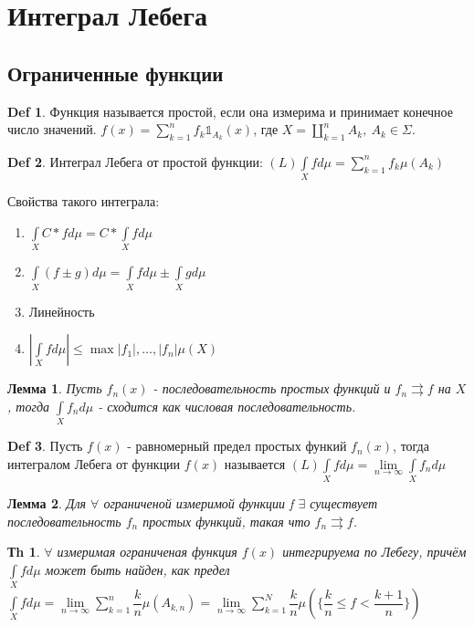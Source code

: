 \documentclass[14pt]{article}
\theoremstyle{plain}
\newtheorem{Thm}{Тh}
\newtheorem{Lem}{Лемма}
\theoremstyle{definition}
\newtheorem{Def}{Def}
\begin{document}
	\section{Интеграл Лебега}
		\subsection{Ограниченные функции}
		\begin{Def}
			Функция называется простой, если она измерима и принимает конечное число значений. $f(x) = \sum\limits_{k=1}^{n} f_k \mathbb{1}_{A_k}(x)$, где $X = \coprod\limits_{k=1}^{n} A_k, \ A_k \in \Sigma$.
		\end{Def}
		\begin{Def}
			Интеграл Лебега от простой функции: $(L)\int\limits_{X} f d\mu = \sum\limits_{k=1}^n f_k \mu(A_k)$
		\end{Def}
		Свойства такого интеграла:
		\begin{enumerate}
			\item $\int\limits_{X}C* f d\mu = C* \int\limits_{X} f d\mu$
			\item $\int\limits_{X} (f \pm g) d\mu = \int\limits_{X} f d\mu \pm \int\limits_{X} g d\mu$
			\item Линейность
			\item $| \int\limits_{X} fd\mu| \leq \max{|f_1|, \dots, |f_n|} \mu (X)$
		\end{enumerate}
		\begin{Lem}
			Пусть $f_n(x)$ - последовательность простых функций и $f_n \rightrightarrows f$ на $X$, тогда $\int\limits_{X} f_n d\mu $ - сходится как числовая последовательность.
		\end{Lem}
		\begin{Def}
			Пусть $f(x)$ - равномерный предел простых функий $f_n(x)$, тогда интегралом Лебега от функции $f(x)$ называется $(L) \int\limits_X f d\mu = \lim\limits_{n \to \infty} \int\limits_{X} f_n d\mu$
		\end{Def}
		\begin{Lem}
			Для $\forall$ ограниченой измеримой функции f $\exists$ существует последовательность $f_n$ простых функций, такая что $f_n \rightrightarrows f$. 
		\end{Lem}
		\begin{Thm}
			$\forall$ измеримая ограниченая функция $f(x)$ интегрируема по Лебегу, причём $\int\limits_{X} f d\mu$ может быть найден, как предел $\int\limits_{X} f d\mu = \lim\limits_{n \to \infty} \sum\limits_{k=1}^{n} \dfrac{k}{n} \mu(A_{k,n}) = \lim\limits_{n \to \infty} \sum\limits_{k=1}^{N} \dfrac{k}{n} \mu(\{\dfrac{k}{n} \leq f < \dfrac{k+1}{n}\})$
		\end{Thm}
\end{document}
